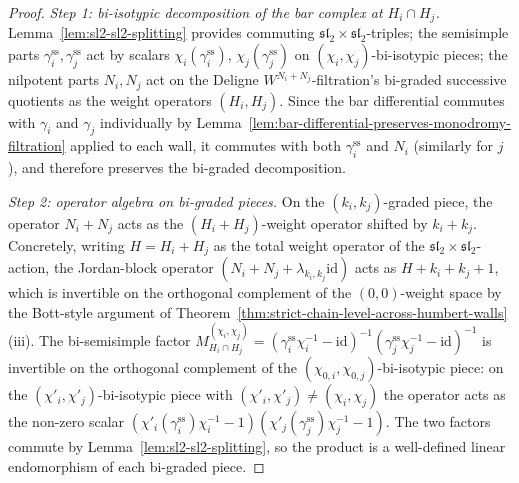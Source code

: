 \begin{proof}
\emph{Step 1: bi-isotypic decomposition of the bar complex at
$H_i\cap H_j$.} Lemma~\textup{\ref{lem:sl2-sl2-splitting}} provides
commuting $\mathfrak{sl}_2\times\mathfrak{sl}_2$-triples; the
semisimple parts $\gamma_i^{\mathrm{ss}},\gamma_j^{\mathrm{ss}}$ act
by scalars $\chi_i(\gamma_i^{\mathrm{ss}})$,
$\chi_j(\gamma_j^{\mathrm{ss}})$ on
$(\chi_i,\chi_j)$-bi-isotypic pieces; the nilpotent parts $N_i,N_j$
act on the Deligne $W^{N_i+N_j}$-filtration's bi-graded successive
quotients as the weight operators $(H_i,H_j)$. Since the bar
differential commutes with $\gamma_i$ and $\gamma_j$ individually by
Lemma~\textup{\ref{lem:bar-differential-preserves-monodromy-filtration}}
applied to each wall, it commutes with both $\gamma_i^{\mathrm{ss}}$
and $N_i$ (similarly for $j$), and therefore preserves the bi-graded
decomposition.

\emph{Step 2: operator algebra on bi-graded pieces.} On the
$(k_i,k_j)$-graded piece, the operator $N_i+N_j$ acts as the
$(H_i+H_j)$-weight operator shifted by $k_i+k_j$. Concretely, writing
$H=H_i+H_j$ as the total weight operator of the
$\mathfrak{sl}_2\times\mathfrak{sl}_2$-action, the Jordan-block
operator $(N_i+N_j+\lambda_{k_i,k_j}\mathrm{id})$ acts as
$H + k_i + k_j + 1$, which is invertible on the orthogonal complement
of the $(0,0)$-weight space by the Bott-style argument of
Theorem~\textup{\ref{thm:strict-chain-level-across-humbert-walls}}(iii).
The bi-semisimple factor
$M^{(\chi_i,\chi_j)}_{H_i\cap H_j}
=(\gamma_i^{\mathrm{ss}}\chi_i^{-1}-\mathrm{id})^{-1}
 (\gamma_j^{\mathrm{ss}}\chi_j^{-1}-\mathrm{id})^{-1}$
is invertible on the orthogonal complement of the
$(\chi_{0,i},\chi_{0,j})$-bi-isotypic piece: on the
$(\chi'_i,\chi'_j)$-bi-isotypic piece with
$(\chi'_i,\chi'_j)\neq(\chi_i,\chi_j)$ the operator acts as the
non-zero scalar
$(\chi'_i(\gamma_i^{\mathrm{ss}})\chi_i^{-1}-1)
 (\chi'_j(\gamma_j^{\mathrm{ss}})\chi_j^{-1}-1)$. The two factors
commute by Lemma~\textup{\ref{lem:sl2-sl2-splitting}}, so the product
is a well-defined linear endomorphism of each bi-graded piece.


\end{proof}
